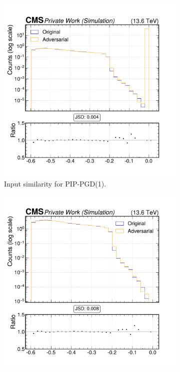 \begin{figure}[h]
  \centering
  \begin{subfigure}[t]{0.32\textwidth}
    \includegraphics[width=\linewidth]{media/output/features/compare/combined_it_1/cmp_npf_arr_Npfcan_deltaR.pdf}
    \caption*{Input similarity for PIP-PGD(1).}
  \end{subfigure}\hfill
  \begin{subfigure}[t]{0.32\textwidth}
    \includegraphics[width=\linewidth]{media/output/features/compare/combined_it_2/cmp_npf_arr_Npfcan_deltaR.pdf}

\end{subfigure}
\end{figure}
